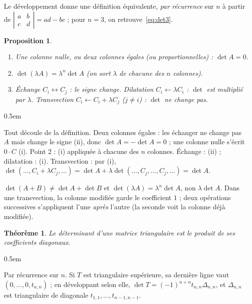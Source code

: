 \documentclass[a4paper,11pt]{article}
\makeatletter
\numberwithin{equation}{section}
\numberwithin{figure}{section}
\numberwithin{table}{section}
\theoremstyle{enonce}
\newtheorem{theoreme}[definition]{Théorème}
\newtheorem{proposition}[definition]{Proposition}
\theoremstyle{exemple}
\theoremstyle{remarque}
\renewcommand{\proofname}{Démonstration}
\renewenvironment{proof}[1][\proofname]{\par\pushQED{\qed}\normalfont
  \topsep0.5em\relax\trivlist\item[\hskip\labelsep\sffamily\itshape\color{Gris}#1.]\ignorespaces}
  {\popQED\endtrivlist\@endpefalse}
\newcommand{\dt}[1]{\left|\begin{matrix}#1\end{matrix}\right|}
\makeatother
\begin{document}
Le développement donne une définition équivalente, \emph{par récurrence} sur $n$ à partir de $\dt{a&b\\c&d}=ad-bc$ ; pour
$n=3$, on retrouve~\eqref{eq:det3}.

\begin{proposition}\label{prop:op}
\begin{enumerate}
\item Une colonne nulle, ou deux colonnes égales (ou proportionnelles) : $\det A=0$.
\item $\det(\lambda A)=\lambda^n\det A$ \quad (on sort $\lambda$ de chacune des $n$ colonnes).
\item Échange $C_i\leftrightarrow C_j$ : le signe change. Dilatation $C_i\leftarrow\lambda C_i$ : $\det$ est multiplié
      par $\lambda$. Transvection $C_i\leftarrow C_i+\lambda C_j$ ($j\neq i$) : $\det$ \emph{ne change pas}.
\end{enumerate}
\end{proposition}

\begin{proof}
Tout découle de la définition. Deux colonnes égales : les échanger ne change pas $A$ mais change le signe (ii), donc
$\det A=-\det A=0$ ; une colonne nulle s'écrit $0\cdot C$ (i). Point 2 : (i) appliquée à chacune des $n$ colonnes. Échange :
(ii) ; dilatation : (i). Transvection : par (i), $\det(\dots,C_i+\lambda C_j,\dots)=\det A+\lambda\det(\dots,C_j,\dots,C_j,\dots)=\det A$.
\end{proof}

\begin{attention}
$\det(A+B)\neq\det A+\det B$ et $\det(\lambda A)=\lambda^n\det A$, non $\lambda\det A$. Dans une transvection, la colonne
modifiée garde le coefficient $1$ ; deux opérations successives s'appliquent l'une \emph{après} l'autre (la seconde voit la
colonne déjà modifiée).
\end{attention}

\begin{theoreme}\label{thm:tri}
Le déterminant d'une matrice triangulaire est le produit de ses coefficients diagonaux.
\end{theoreme}

\begin{proof}
Par récurrence sur $n$. Si $T$ est triangulaire supérieure, sa dernière ligne vaut $(0,\dots,0,t_{n,n})$ ; en développant
selon elle, $\det T=(-1)^{n+n}t_{n,n}\Delta_{n,n}$, et $\Delta_{n,n}$ est triangulaire de diagonale
$t_{1,1},\dots,t_{n-1,n-1}$.
\end{proof}
\end{document}
